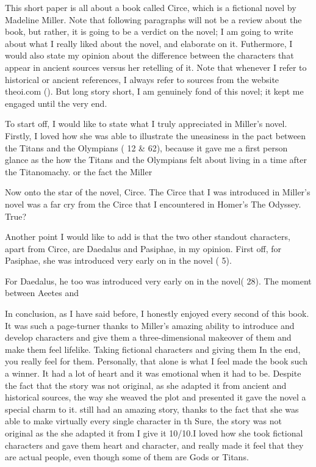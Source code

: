 \documentclass[12pt, a4paper]{article}
\begin{document}
This short paper is all about a book called Circe, which is a fictional novel by Madeline Miller. Note that following paragraphs will not be a review about the book, but rather, it is going to be a verdict on the novel; I am going to write about what I really liked about the novel, and elaborate on it. Futhermore, I would also state my opinion about the difference between the characters that appear in ancient sources versus her retelling of it. Note that whenever I refer to historical or ancient references, I always refer to sources from the website theoi.com (\cite{theoi}). But long story short, I am genuinely fond of this novel; it kept me engaged until the very end. 

To start off, I would like to state what I truly appreciated in Miller's novel. Firstly, I loved how she was able to illustrate the uneasiness in the pact between the Titans and the Olympians (\cite{miller_circe_2018} 12 \& 62), because it gave me a first person glance as the how the Titans and the Olympians felt about living in a time after the Titanomachy. or the fact the Miller 

Now onto the star of the novel, Circe. The Circe that I was introduced in Miller's novel was a far cry from the Circe that I encountered in Homer's The Odyssey. True?

Another point I would like to add is that the two other standout characters, apart from Circe, are Daedalus and Pasiphae, in my opinion. First off, for Pasiphae, she was introduced very early on in the novel (\cite{miller_circe_2018} 5).

For Daedalus, he too was introduced very early on in the novel(\cite{miller_circe_2018} 28). The moment between Aeetes and 

In conclusion, as I have said before, I honestly enjoyed every second of this book. It was such a page-turner thanks to Miller's amazing ability to introduce and develop characters and give them a three-dimensional makeover of them and make them feel lifelike. Taking fictional characters and giving them In the end, you really feel for them. Personally, that alone is what I feel made the book such a winner. It had a lot of heart and it was emotional when it had to be. Despite the fact that the story was not original, as she adapted it from ancient and historical sources, the way she weaved the plot and presented it gave the novel a special charm to it. still had an amazing story, thanks to the fact that she was able to make virtually every single character in th Sure, the story was not original as the she adapted it from I give it 10/10.I loved how she took fictional characters and gave them heart and character, and really made it feel that they are actual people, even though some of them are Gods or Titans.

\newpage
\printbibliography
\end{document}
